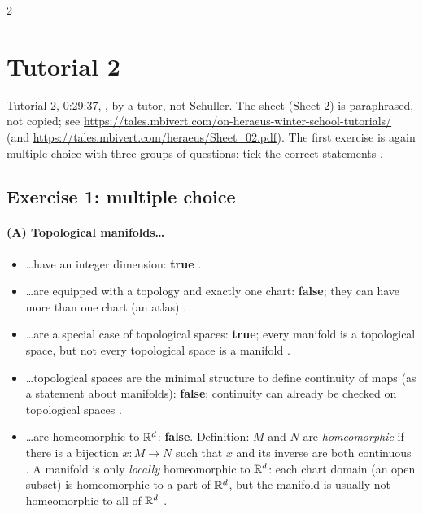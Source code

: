 \begin{paracol}{2}
\section{Tutorial 2}\label{sec:t02-1}

Tutorial 2, 0:29:37, , by a tutor, not Schuller. The sheet (Sheet 2) is paraphrased, not copied; see \url{https://tales.mbivert.com/on-heraeus-winter-school-tutorials/} (and \url{https://tales.mbivert.com/heraeus/Sheet_02.pdf}).
The first exercise is again multiple choice with three groups of questions: tick the correct statements .

\subsection*{Exercise 1: multiple choice}

\paragraph{(A) Topological manifolds\dots}
\begin{itemize}
  \item \dots have an integer dimension: \textbf{true} .
  \item \dots are equipped with a topology and exactly one chart: \textbf{false}; they can have more than one chart (an atlas) .
  \item \dots are a special case of topological spaces: \textbf{true}; every manifold is a topological space, but not every topological space is a manifold .
  \item \dots topological spaces are the minimal structure to define continuity of maps (as a statement about manifolds): \textbf{false}; continuity can already be checked on topological spaces .
  \item \dots are homeomorphic to $\mathbb{R}^d$: \textbf{false}. Definition: $M$ and $N$ are \emph{homeomorphic} if there is a bijection $x\colon M\to N$ such that $x$ and its inverse are both continuous .
        A manifold is only \emph{locally} homeomorphic to $\mathbb{R}^d$: each chart domain (an open subset) is homeomorphic to a part of $\mathbb{R}^d$, but the manifold is usually not homeomorphic to all of $\mathbb{R}^d$ .
\end{itemize}


\end{paracol}
